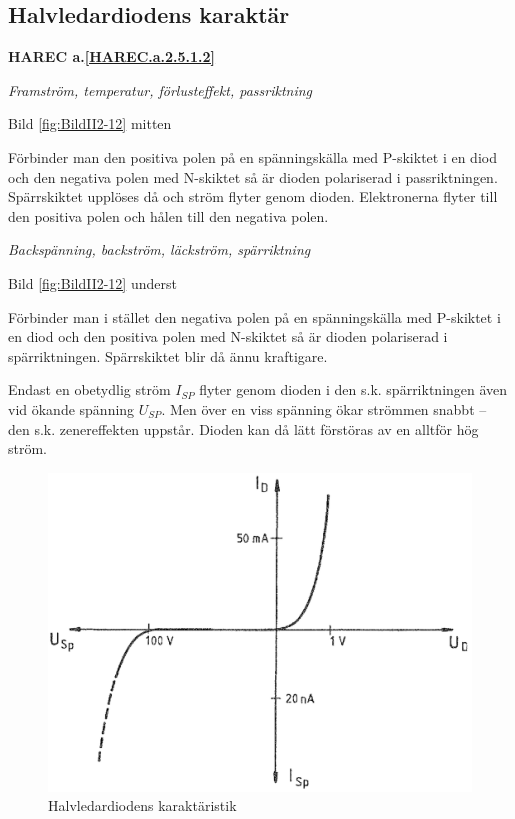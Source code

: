 \subsection{Halvledardiodens karaktär}
\textbf{HAREC a.\ref{HAREC.a.2.5.1.2}\label{myHAREC.a.2.5.1.2}}

\emph{Framström, temperatur, förlusteffekt, passriktning}

Bild \ref{fig:BildII2-12} mitten

Förbinder man den positiva polen på en spänningskälla med P-skiktet i en diod
och den negativa polen med N-skiktet så är dioden polariserad i passriktningen.
Spärrskiktet upplöses då och ström flyter genom dioden. Elektronerna flyter till
den positiva polen och hålen till den negativa polen.

\emph{Backspänning, backström, läckström, spärriktning}

Bild \ref{fig:BildII2-12} underst

Förbinder man i stället den negativa polen på en spänningskälla med P-skiktet i
en diod och den positiva polen med N-skiktet så är dioden polariserad i
spärriktningen. Spärrskiktet blir då ännu kraftigare.

Endast en obetydlig ström \(I_{SP}\) flyter genom dioden i den s.k.
spärriktningen även vid ökande spänning \(U_{SP}\). Men över en viss spänning
ökar strömmen snabbt -- den s.k. zenereffekten uppstår. Dioden kan då lätt
förstöras av en alltför hög ström.

\begin{figure}
\includegraphics[width=\textwidth]{images/cropped_pdfs/bild_2_2-13.pdf}
\caption{Halvledardiodens karaktäristik}
\label{fig:BildII2-13}
\end{figure}

